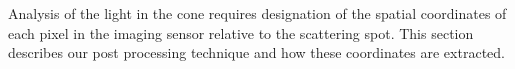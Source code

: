 Analysis of the light in the cone requires designation of the spatial
coordinates of each pixel in the imaging sensor relative to the scattering
spot.  This section describes our post processing technique and how these
coordinates are extracted.
